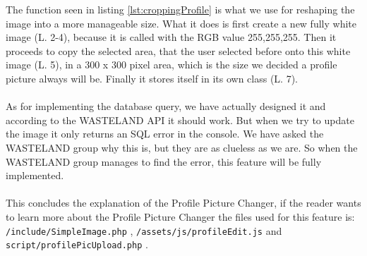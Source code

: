 The function seen in listing \ref{lst:croppingProfile} is what we use for reshaping the image into a more manageable size. What it does is first create a new fully white image (L. 2-4), because it is called with the RGB value 255,255,255. Then it proceeds to copy the selected area, that the user selected before onto this white image (L. 5), in a 300 x 300 pixel area, which is the size we decided a profile picture always will be. Finally it stores itself in its own class (L. 7).\\
\\
As for implementing the database query, we have actually designed it and according to the WASTELAND API \citep{wastelandApi} it should work. But when we try to update the image it only returns an SQL error in the console. We have asked the WASTELAND group why this is, but they are as clueless as we are. So when the WASTELAND group manages to find the error, this feature will be fully implemented.\\
\\
This concludes the explanation of the Profile Picture Changer, if the reader wants to learn more about the Profile Picture Changer the files used for this feature is: \texttt{/include/SimpleImage.php} , \texttt{/assets/js/profileEdit.js} and \texttt{script/profilePicUpload.php} .









